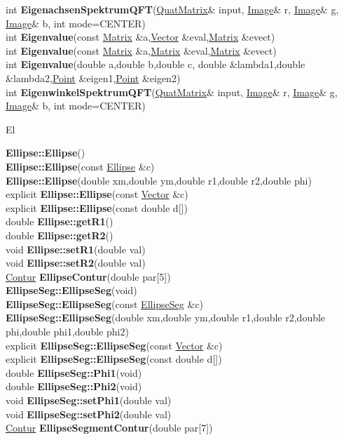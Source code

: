 \documentclass[10pt,titlepage]{article}
\def\functionlistentry#1#2#3#4#5#6{\noindent #1 {\bf #2}(#3) \dotfill #6\\}
\def\letterref#1{}
\def\letterlabel#1{\vspace{0.5cm}\centerline{\Large #1}}
\def\letterlabelend#1{}
\begin{document}
{{\letterref{Ed}
\letterref{Ei}
\letterref{El}
\letterref{Eq}
\letterref{Er}
\letterref{Es}
\letterlabelend{Ei}
\functionlistentry{int}{EigenachsenSpektrumQFT}{\hyperlink{QuatMatrix}{QuatMatrix}\& input, \hyperlink{Image}{Image}\& r, \hyperlink{Image}{Image}\& g, \hyperlink{Image}{Image}\& b, int mode=CENTER}{1543}{quaternions}{}
\functionlistentry{int}{Eigenvalue}{const \hyperlink{Matrix}{Matrix} \&a,\hyperlink{Vector}{Vector} \&eval,\hyperlink{Matrix}{Matrix} \&evect}{1128}{matrixAlgebra}{}
\functionlistentry{int}{Eigenvalue}{const \hyperlink{Matrix}{Matrix} \&a,\hyperlink{Matrix}{Matrix} \&eval,\hyperlink{Matrix}{Matrix} \&evect}{1129}{matrixAlgebra}{}
\functionlistentry{int}{Eigenvalue}{double a,double b,double c, double \&lambda1,double \&lambda2,\hyperlink{Point}{Point} \&eigen1,\hyperlink{Point}{Point} \&eigen2}{1130}{matrixAlgebra}{}
\functionlistentry{int}{EigenwinkelSpektrumQFT}{\hyperlink{QuatMatrix}{QuatMatrix}\& input, \hyperlink{Image}{Image}\& r, \hyperlink{Image}{Image}\& g, \hyperlink{Image}{Image}\& b, int mode=CENTER}{1542}{quaternions}{}

\letterlabel{El}
\letterref{A}
\letterref{B}
\letterref{C}
\letterref{D}
\letterref{E}
\letterref{F}
\letterref{G}
\letterref{H}
\letterref{I}
\letterref{K}
\letterref{L}
\letterref{M}
\letterref{N}
\letterref{O}
\letterref{P}
\letterref{Q}
\letterref{R}
\letterref{S}
\letterref{T}
\letterref{U}
\letterref{V}
\letterref{W}
\letterref{X}
\letterref{Y}
\letterref{Z}

\letterref{Ed}
\letterref{Ei}
\letterref{El}
\letterref{Eq}
\letterref{Er}
\letterref{Es}
\letterlabelend{El}
\functionlistentry{}{Ellipse::Ellipse}{}{532}{geoObject}{}
\functionlistentry{}{Ellipse::Ellipse}{const \hyperlink{Ellipse}{Ellipse} \&c}{533}{geoObject}{}
\functionlistentry{}{Ellipse::Ellipse}{double xm,double ym,double r1,double r2,double phi}{534}{geoObject}{}
\functionlistentry{explicit}{Ellipse::Ellipse}{const \hyperlink{Vector}{Vector} \&c}{535}{geoObject}{}
\functionlistentry{explicit}{Ellipse::Ellipse}{const double d[]}{536}{geoObject}{}
\functionlistentry{double}{Ellipse::getR1}{}{537}{geoObject}{}
\functionlistentry{double}{Ellipse::getR2}{}{539}{geoObject}{}
\functionlistentry{void}{Ellipse::setR1}{double val}{538}{geoObject}{}
\functionlistentry{void}{Ellipse::setR2}{double val}{540}{geoObject}{}
\functionlistentry{\hyperlink{Contur}{Contur}}{EllipseContur}{double par[5]}{1333}{graphics}{}
\functionlistentry{}{EllipseSeg::EllipseSeg}{void}{541}{geoObject}{}
\functionlistentry{}{EllipseSeg::EllipseSeg}{const \hyperlink{EllipseSeg}{EllipseSeg} \&c}{542}{geoObject}{}
\functionlistentry{}{EllipseSeg::EllipseSeg}{double xm,double ym,double r1,double r2,double phi,double phi1,double phi2}{543}{geoObject}{}
\functionlistentry{explicit}{EllipseSeg::EllipseSeg}{const \hyperlink{Vector}{Vector} \&c}{544}{geoObject}{}
\functionlistentry{explicit}{EllipseSeg::EllipseSeg}{const double d[]}{545}{geoObject}{}
\functionlistentry{double}{EllipseSeg::Phi1}{void}{546}{geoObject}{}
\functionlistentry{double}{EllipseSeg::Phi2}{void}{548}{geoObject}{}
\functionlistentry{void}{EllipseSeg::setPhi1}{double val}{547}{geoObject}{}
\functionlistentry{void}{EllipseSeg::setPhi2}{double val}{549}{geoObject}{}
\functionlistentry{\hyperlink{Contur}{Contur}}{EllipseSegmentContur}{double par[7]}{1335}{graphics}{}

}}
\end{document}
